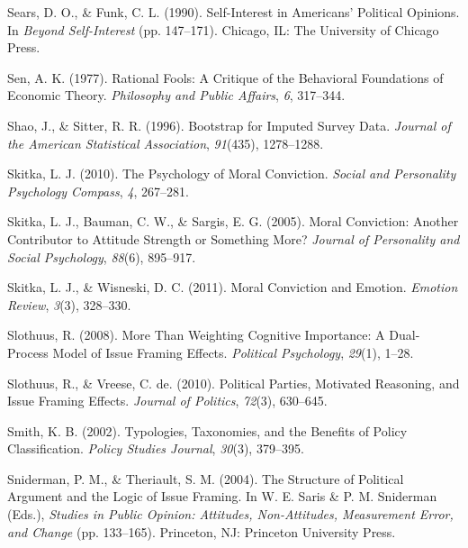 \documentclass[12pt,econ]{sources/authesis}
\begin{document}
\leavevmode\hypertarget{ref-sears_self-interest_1990}{}%
Sears, D. O., \& Funk, C. L. (1990). Self-Interest in Americans' Political Opinions. In \emph{Beyond Self-Interest} (pp. 147--171). Chicago, IL: The University of Chicago Press.

\leavevmode\hypertarget{ref-sen_rational_1977}{}%
Sen, A. K. (1977). Rational Fools: A Critique of the Behavioral Foundations of Economic Theory. \emph{Philosophy and Public Affairs}, \emph{6}, 317--344.

\leavevmode\hypertarget{ref-shao_1996_bootstrap}{}%
Shao, J., \& Sitter, R. R. (1996). Bootstrap for Imputed Survey Data. \emph{Journal of the American Statistical Association}, \emph{91}(435), 1278--1288.

\leavevmode\hypertarget{ref-skitka_psychology_2010}{}%
Skitka, L. J. (2010). The Psychology of Moral Conviction. \emph{Social and Personality Psychology Compass}, \emph{4}, 267--281.

\leavevmode\hypertarget{ref-skitka_moral_2005}{}%
Skitka, L. J., Bauman, C. W., \& Sargis, E. G. (2005). Moral Conviction: Another Contributor to Attitude Strength or Something More? \emph{Journal of Personality and Social Psychology}, \emph{88}(6), 895--917.

\leavevmode\hypertarget{ref-skitka_moral_2011}{}%
Skitka, L. J., \& Wisneski, D. C. (2011). Moral Conviction and Emotion. \emph{Emotion Review}, \emph{3}(3), 328--330.

\leavevmode\hypertarget{ref-slothuus_more_2008}{}%
Slothuus, R. (2008). More Than Weighting Cognitive Importance: A Dual-Process Model of Issue Framing Effects. \emph{Political Psychology}, \emph{29}(1), 1--28.

\leavevmode\hypertarget{ref-slothuus_political_2010}{}%
Slothuus, R., \& Vreese, C. de. (2010). Political Parties, Motivated Reasoning, and Issue Framing Effects. \emph{Journal of Politics}, \emph{72}(3), 630--645.

\leavevmode\hypertarget{ref-smith_typologies_2002}{}%
Smith, K. B. (2002). Typologies, Taxonomies, and the Benefits of Policy Classification. \emph{Policy Studies Journal}, \emph{30}(3), 379--395.

\leavevmode\hypertarget{ref-sniderman_structure_2004}{}%
Sniderman, P. M., \& Theriault, S. M. (2004). The Structure of Political Argument and the Logic of Issue Framing. In W. E. Saris \& P. M. Sniderman (Eds.), \emph{Studies in Public Opinion: Attitudes, Non-Attitudes, Measurement Error, and Change} (pp. 133--165). Princeton, NJ: Princeton University Press.
\end{document}
